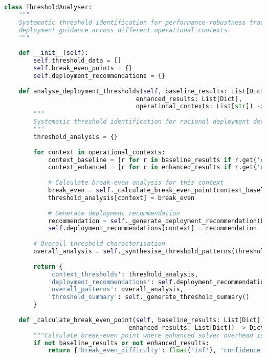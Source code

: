 \begin{lstlisting}[language=Python, caption=Cost-Benefit Threshold Analysis for Deployment Guidance]
class ThresholdAnalyser:
    """
    Systematic threshold identification for performance-robustness trade-off
    deployment guidance across different operational contexts.
    """
    
    def __init__(self):
        self.threshold_data = []
        self.break_even_points = {}
        self.deployment_recommendations = {}
    
    def analyse_deployment_thresholds(self, baseline_results: List[Dict], 
                                    enhanced_results: List[Dict],
                                    operational_contexts: List[str]) -> Dict[str, Any]:
        """
        Systematic threshold identification for rational deployment decisions.
        """
        threshold_analysis = {}
        
        for context in operational_contexts:
            context_baseline = [r for r in baseline_results if r.get('context') == context]
            context_enhanced = [r for r in enhanced_results if r.get('context') == context]
            
            # Calculate break-even analysis for this context
            break_even = self._calculate_break_even_point(context_baseline, context_enhanced)
            threshold_analysis[context] = break_even
            
            # Generate deployment recommendation
            recommendation = self._generate_deployment_recommendation(break_even, context)
            self.deployment_recommendations[context] = recommendation
        
        # Overall threshold characterisation
        overall_analysis = self._synthesise_threshold_patterns(threshold_analysis)
        
        return {
            'context_thresholds': threshold_analysis,
            'deployment_recommendations': self.deployment_recommendations,
            'overall_patterns': overall_analysis,
            'threshold_summary': self._generate_threshold_summary()
        }
    
    def _calculate_break_even_point(self, baseline_results: List[Dict], 
                                  enhanced_results: List[Dict]) -> Dict[str, float]:
        """Calculate break-even point where enhanced solver overhead is justified"""
        if not baseline_results or not enhanced_results:
            return {'break_even_difficulty': float('inf'), 'confidence': 0.0}
        

\end{lstlisting}
